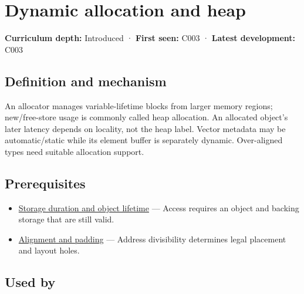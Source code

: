 \hypertarget{appendix-c3480f7d9ff3}{}\label{referencestart:appendix-c3480f7d9ff3}
\section{Dynamic allocation and heap}\label{appendix-c3480f7d9ff3-dynamic-allocation-and-heap}

\hypertarget{appendix-c3480f7d9ff3-dynamic-allocation-and-heap}{}

\textbf{Curriculum depth:} Introduced · \textbf{First seen:} C003 · \textbf{Latest development:} C003

\begin{allmightroledefinition}

\subsection{Definition and mechanism}\label{appendix-c3480f7d9ff3-definition-and-mechanism}

\hypertarget{appendix-c3480f7d9ff3-definition-and-mechanism}{}

An allocator manages variable-lifetime blocks from larger memory regions; new/free-store usage is commonly called heap allocation. An allocated object's later latency depends on locality, not the heap label. Vector metadata may be automatic/static while its element buffer is separately dynamic. Over-aligned types need suitable allocation support.

\end{allmightroledefinition}

\subsection{Prerequisites}\label{appendix-c3480f7d9ff3-prerequisites}

\hypertarget{appendix-c3480f7d9ff3-prerequisites}{}

\begin{itemize}
\tightlist
\item
  \hyperref[appendix-0b104bcba06b]{Storage duration and object lifetime} --- Access requires an object and backing storage that are still valid.
\item
  \hyperref[appendix-a1f7c53b4742]{Alignment and padding} --- Address divisibility determines legal placement and layout holes.
\end{itemize}

\subsection{Used by}\label{appendix-c3480f7d9ff3-used-by}

